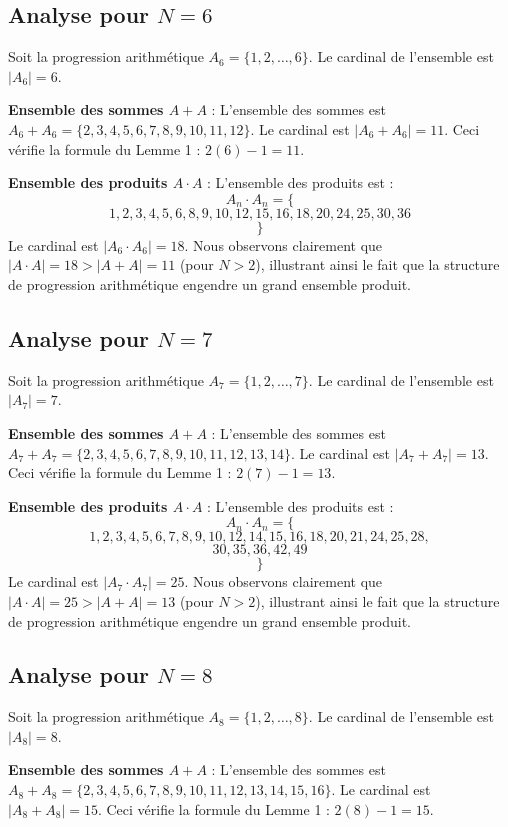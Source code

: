 \documentclass[11pt,a4paper]{article}
\begin{document}
\subsection{Analyse pour $N = 6$}
Soit la progression arithmétique $A_{6} = \{1, 2, \dots, 6\} $. Le cardinal de l'ensemble est $|A_{6}| = 6$.

\textbf{Ensemble des sommes $A+A$} :
L'ensemble des sommes est $A_{6} + A_{6} = \{2, 3, 4, 5, 6, 7, 8, 9, 10, 11, 12\} $. Le cardinal est $|A_{6} + A_{6}| = 11$. Ceci vérifie la formule du Lemme 1 : $2(6) - 1 = 11$.

\textbf{Ensemble des produits $A \cdot A$} :
L'ensemble des produits est :
$$ A_{{{n}}} \cdot A_{{{n}}} = \{ $$$$ 1, 2, 3, 4, 5, 6, 8, 9, 10, 12, 15, 16, 18, 20, 24, 25, 30, 36 $$$$ \} $$
Le cardinal est $|A_{6} \cdot A_{6}| = 18$.
Nous observons clairement que $|A \cdot A| = 18 > |A+A| = 11$ (pour $N > 2$), illustrant ainsi le fait que la structure de progression arithmétique engendre un grand ensemble produit.
\newpage

\subsection{Analyse pour $N = 7$}
Soit la progression arithmétique $A_{7} = \{1, 2, \dots, 7\} $. Le cardinal de l'ensemble est $|A_{7}| = 7$.

\textbf{Ensemble des sommes $A+A$} :
L'ensemble des sommes est $A_{7} + A_{7} = \{2, 3, 4, 5, 6, 7, 8, 9, 10, 11, 12, 13, 14\} $. Le cardinal est $|A_{7} + A_{7}| = 13$. Ceci vérifie la formule du Lemme 1 : $2(7) - 1 = 13$.

\textbf{Ensemble des produits $A \cdot A$} :
L'ensemble des produits est :
$$ A_{{{n}}} \cdot A_{{{n}}} = \{ $$$$ 1, 2, 3, 4, 5, 6, 7, 8, 9, 10, 12, 14, 15, 16, 18, 20, 21, 24, 25, 28, $$$$ 30, 35, 36, 42, 49 $$$$ \} $$
Le cardinal est $|A_{7} \cdot A_{7}| = 25$.
Nous observons clairement que $|A \cdot A| = 25 > |A+A| = 13$ (pour $N > 2$), illustrant ainsi le fait que la structure de progression arithmétique engendre un grand ensemble produit.
\newpage

\subsection{Analyse pour $N = 8$}
Soit la progression arithmétique $A_{8} = \{1, 2, \dots, 8\} $. Le cardinal de l'ensemble est $|A_{8}| = 8$.

\textbf{Ensemble des sommes $A+A$} :
L'ensemble des sommes est $A_{8} + A_{8} = \{2, 3, 4, 5, 6, 7, 8, 9, 10, 11, 12, 13, 14, 15, 16\} $. Le cardinal est $|A_{8} + A_{8}| = 15$. Ceci vérifie la formule du Lemme 1 : $2(8) - 1 = 15$.
\end{document}
